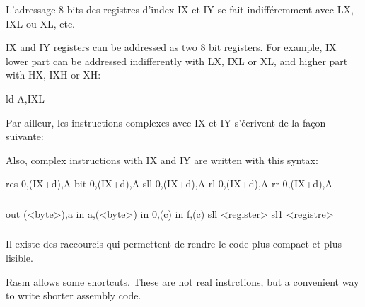 \begin{xfr}
L'adressage 8 bits des registres d'index IX et IY se fait indifféremment avec LX, IXL ou XL, etc.
\end{xfr}


\begin{xen}
IX and IY registers can be addressed as two 8 bit registers. For example, IX lower part
can be addressed indifferently with LX, IXL or XL, and higher part with HX, IXH or XH:
\end{xen}

\begin{code}
ld A,IXL
\end{code}

\begin{xfr}
Par ailleur, les instructions complexes avec IX et IY s'écrivent de la façon suivante:
\end{xfr}

\begin{xen}
Also, complex instructions with IX and IY are written with this syntax:
\end{xen}

\begin{code}
  res 0,(IX+d),A
  bit 0,(IX+d),A
  sll 0,(IX+d),A
  rl  0,(IX+d),A
  rr  0,(IX+d),A
\end{code}

\subsubsection{}
\begin{code}
  out (<byte>),a
  in a,(<byte>)
  in 0,(c)
  in f,(c)
  sll <register>
  sl1 <registre>
\end{code}

\subsubsection{}

\begin{xfr}
Il existe des raccourcis qui permettent de rendre le code plus compact et plus lisible.
\end{xfr}

\begin{xen}
Rasm allows some shortcuts. These are not real instrctions,
but a convenient way to write shorter assembly code.
\end{xen}

